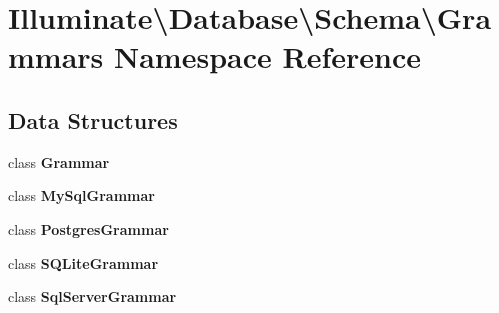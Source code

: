 \section{Illuminate\textbackslash{}Database\textbackslash{}Schema\textbackslash{}Grammars Namespace Reference}
\label{namespace_illuminate_1_1_database_1_1_schema_1_1_grammars}
\subsection*{Data Structures}
\begin{DoxyCompactItemize}
\item 
class {\bf Grammar}
\item 
class {\bf My\+Sql\+Grammar}
\item 
class {\bf Postgres\+Grammar}
\item 
class {\bf S\+Q\+Lite\+Grammar}
\item 
class {\bf Sql\+Server\+Grammar}
\end{DoxyCompactItemize}
